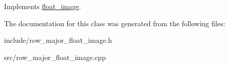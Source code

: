 Implements \hyperlink{classfloat__image_a62e1446efb51fadcfeebf50568f9d1e9}{float\-\_\-image}.



The documentation for this class was generated from the following files\-:\begin{DoxyCompactItemize}
\item 
include/row\-\_\-major\-\_\-float\-\_\-image.\-h\item 
src/row\-\_\-major\-\_\-float\-\_\-image.\-cpp\end{DoxyCompactItemize}
